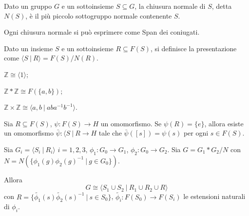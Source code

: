 \begin{defn}
    Dato un gruppo $G$ e un sottoinsieme $S\subseteq G$, la chiusura normale di $S$, detta $N(S)$, \`e il pi\`u piccolo sottogruppo normale contenente $S$.
\end{defn}

\begin{oss}
    Ogni chiusura normale si pu\`o esprimere come Span dei coniugati.
\end{oss}

\begin{defn}
    Dato un insieme $S$ e un sottoinsieme $R\subseteq F(S)$, si definisce la presentazione come $\langle S \ |\ R\rangle = F(S)/N(R)$.
\end{defn}

\begin{ex}
    \begin{nlist}
        \item $\mathbb{Z} \cong \langle 1 \rangle$;
        \item $\mathbb{Z}*\mathbb{Z}\cong F(\{a,b\})$;
        \item $\mathbb{Z}\times\mathbb{Z}\cong\langle a,b\ |\ aba^{-1}b^{-1}\rangle$.
    \end{nlist}
\end{ex}

\begin{prop}
    Sia $R\subseteq F(S)$, $\psi\colon F(S)\rightarrow H$ un omomorfismo. Se $\psi(R)=\{e\}$, allora esiste un omomorfismo $\bar{\psi}\colon \langle S\ |\ R \rightarrow H$ tale che $\bar{\psi}([s])=\psi(s)$ per ogni $s\in F(S)$.
\end{prop}

\begin{prop}
    Sia $G_i = \langle S_i\ |\ R_i\rangle$ $i=1,2,3$, $\phi_1\colon G_0 \rightarrow G_1$, $\phi_2\colon G_0\rightarrow G_2$. Sia $G = G_1 * G_2 /N$ con $N = N(\{\phi_1(g)\phi_2(g)^{-1}\ |\ g\in G_0\})$.

    Allora $$G\cong \langle S_1 \cup S_2\ |\ R_1\cup R_2\cup R\rangle$$ con $R =\{\tilde{\phi_1}(s)\tilde{\phi_2}(s)^{-1}\ |\ s\in S_0\}$, $\tilde{\phi_i}\colon F(S_0)\rightarrow F(S_i)$ le estensioni naturali di $\phi_i$.
\end{prop}
